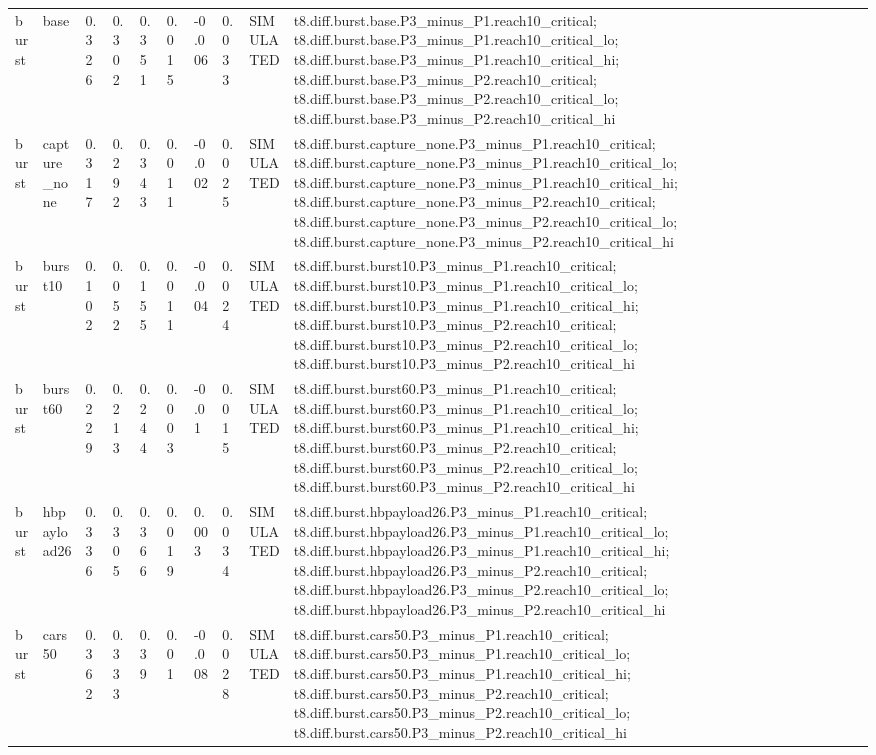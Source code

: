\begin{table}[t]
\begin{tabular}{llllllllll}
burst & base & 0.326 & 0.302 & 0.351 & 0.015 & -0.006 & 0.033 & SIMULATED & t8.diff.burst.base.P3\_minus\_P1.reach10\_critical; t8.diff.burst.base.P3\_minus\_P1.reach10\_critical\_lo; t8.diff.burst.base.P3\_minus\_P1.reach10\_critical\_hi; t8.diff.burst.base.P3\_minus\_P2.reach10\_critical; t8.diff.burst.base.P3\_minus\_P2.reach10\_critical\_lo; t8.diff.burst.base.P3\_minus\_P2.reach10\_critical\_hi \\
burst & capture\_none & 0.317 & 0.292 & 0.343 & 0.011 & -0.002 & 0.025 & SIMULATED & t8.diff.burst.capture\_none.P3\_minus\_P1.reach10\_critical; t8.diff.burst.capture\_none.P3\_minus\_P1.reach10\_critical\_lo; t8.diff.burst.capture\_none.P3\_minus\_P1.reach10\_critical\_hi; t8.diff.burst.capture\_none.P3\_minus\_P2.reach10\_critical; t8.diff.burst.capture\_none.P3\_minus\_P2.reach10\_critical\_lo; t8.diff.burst.capture\_none.P3\_minus\_P2.reach10\_critical\_hi \\
burst & burst10 & 0.102 & 0.052 & 0.155 & 0.011 & -0.004 & 0.024 & SIMULATED & t8.diff.burst.burst10.P3\_minus\_P1.reach10\_critical; t8.diff.burst.burst10.P3\_minus\_P1.reach10\_critical\_lo; t8.diff.burst.burst10.P3\_minus\_P1.reach10\_critical\_hi; t8.diff.burst.burst10.P3\_minus\_P2.reach10\_critical; t8.diff.burst.burst10.P3\_minus\_P2.reach10\_critical\_lo; t8.diff.burst.burst10.P3\_minus\_P2.reach10\_critical\_hi \\
burst & burst60 & 0.229 & 0.213 & 0.244 & 0.003 & -0.01 & 0.015 & SIMULATED & t8.diff.burst.burst60.P3\_minus\_P1.reach10\_critical; t8.diff.burst.burst60.P3\_minus\_P1.reach10\_critical\_lo; t8.diff.burst.burst60.P3\_minus\_P1.reach10\_critical\_hi; t8.diff.burst.burst60.P3\_minus\_P2.reach10\_critical; t8.diff.burst.burst60.P3\_minus\_P2.reach10\_critical\_lo; t8.diff.burst.burst60.P3\_minus\_P2.reach10\_critical\_hi \\
burst & hbpayload26 & 0.336 & 0.305 & 0.366 & 0.019 & 0.003 & 0.034 & SIMULATED & t8.diff.burst.hbpayload26.P3\_minus\_P1.reach10\_critical; t8.diff.burst.hbpayload26.P3\_minus\_P1.reach10\_critical\_lo; t8.diff.burst.hbpayload26.P3\_minus\_P1.reach10\_critical\_hi; t8.diff.burst.hbpayload26.P3\_minus\_P2.reach10\_critical; t8.diff.burst.hbpayload26.P3\_minus\_P2.reach10\_critical\_lo; t8.diff.burst.hbpayload26.P3\_minus\_P2.reach10\_critical\_hi \\
burst & cars50 & 0.362 & 0.333 & 0.39 & 0.01 & -0.008 & 0.028 & SIMULATED & t8.diff.burst.cars50.P3\_minus\_P1.reach10\_critical; t8.diff.burst.cars50.P3\_minus\_P1.reach10\_critical\_lo; t8.diff.burst.cars50.P3\_minus\_P1.reach10\_critical\_hi; t8.diff.burst.cars50.P3\_minus\_P2.reach10\_critical; t8.diff.burst.cars50.P3\_minus\_P2.reach10\_critical\_lo; t8.diff.burst.cars50.P3\_minus\_P2.reach10\_critical\_hi \\

\end{tabular}
\end{table}
